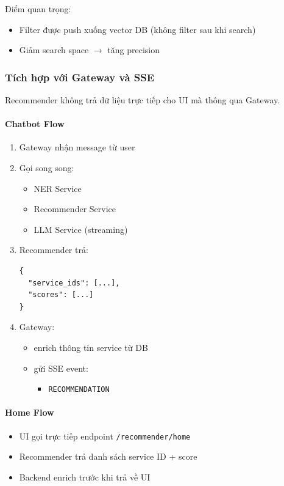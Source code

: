 Điểm quan trọng:
\begin{itemize}
    \item Filter được push xuống vector DB (không filter sau khi search)
    \item Giảm search space $\rightarrow$ tăng precision
\end{itemize}

\subsubsection{Tích hợp với Gateway và SSE}

Recommender không trả dữ liệu trực tiếp cho UI mà thông qua Gateway.

\paragraph{Chatbot Flow}

\begin{enumerate}
    \item Gateway nhận message từ user
    \item Gọi song song:
    \begin{itemize}
        \item NER Service
        \item Recommender Service
        \item LLM Service (streaming)
    \end{itemize}
    \item Recommender trả:
    \begin{verbatim}
{
  "service_ids": [...],
  "scores": [...]
}
    \end{verbatim}
    \item Gateway:
    \begin{itemize}
        \item enrich thông tin service từ DB
        \item gửi SSE event:
        \begin{itemize}
            \item \texttt{RECOMMENDATION}
        \end{itemize}
    \end{itemize}
\end{enumerate}

\paragraph{Home Flow}

\begin{itemize}
    \item UI gọi trực tiếp endpoint \texttt{/recommender/home}
    \item Recommender trả danh sách service ID + score
    \item Backend enrich trước khi trả về UI
\end{itemize}

